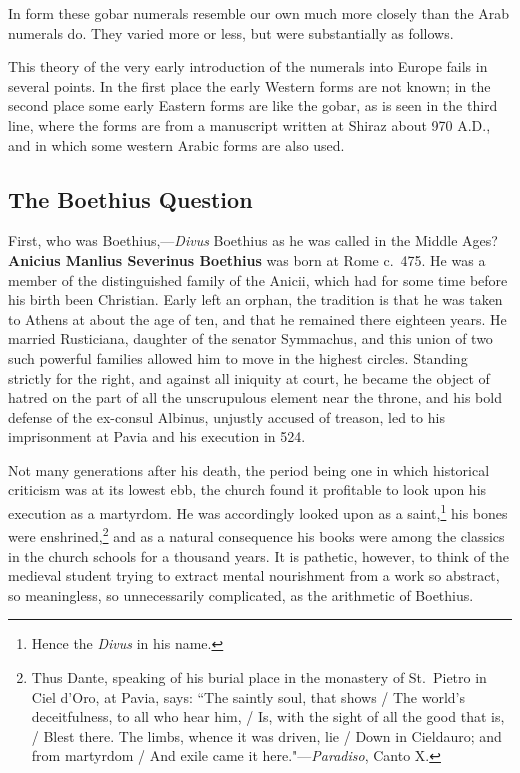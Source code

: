 \documentclass[11pt,a4paper]{article}
\begin{document}
In form these gobar numerals resemble our own much more closely than the Arab numerals do. They varied more or less, but were substantially as follows.

This theory of the very early introduction of the numerals into Europe fails in several points. In the first place the early Western forms are not known; in the second place some early Eastern forms are like the gobar, as is seen in the third line, where the forms are from a manuscript written at Shiraz about 970 A.D., and in which some western Arabic forms are also used.

\subsection*{The Boethius Question}

First, who was Boethius,---\textit{Divus} Boethius as he was called in the Middle Ages? \textbf{Anicius Manlius Severinus Boethius} was born at Rome c.~475. He was a member of the distinguished family of the Anicii, which had for some time before his birth been Christian. Early left an orphan, the tradition is that he was taken to Athens at about the age of ten, and that he remained there eighteen years. He married Rusticiana, daughter of the senator Symmachus, and this union of two such powerful families allowed him to move in the highest circles. Standing strictly for the right, and against all iniquity at court, he became the object of hatred on the part of all the unscrupulous element near the throne, and his bold defense of the ex-consul Albinus, unjustly accused of treason, led to his imprisonment at Pavia and his execution in 524.

Not many generations after his death, the period being one in which historical criticism was at its lowest ebb, the church found it profitable to look upon his execution as a martyrdom. He was accordingly looked upon as a saint,\footnote{Hence the \textit{Divus} in his name.} his bones were enshrined,\footnote{Thus Dante, speaking of his burial place in the monastery of St.\ Pietro in Ciel d'Oro, at Pavia, says: ``The saintly soul, that shows / The world's deceitfulness, to all who hear him, / Is, with the sight of all the good that is, / Blest there. The limbs, whence it was driven, lie / Down in Cieldauro; and from martyrdom / And exile came it here."---\textit{Paradiso}, Canto X.} and as a natural consequence his books were among the classics in the church schools for a thousand years. It is pathetic, however, to think of the medieval student trying to extract mental nourishment from a work so abstract, so meaningless, so unnecessarily complicated, as the arithmetic of Boethius.
\end{document}
